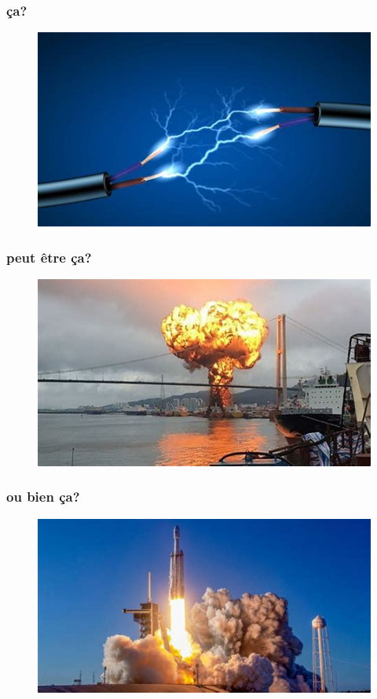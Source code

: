 \documentclass{beamer}
\begin{document}
    \begin{frame}
        \frametitle{ça?}
        
        \begin{figure}
            \includegraphics[width=0.8\linewidth]{electricite.jpg}
    \end{figure}
    \end{frame}

    \begin{frame}
        \frametitle{peut être ça?}
        
        \begin{figure}
            \includegraphics[width=0.8\linewidth]{explosion.jpg}
    \end{figure}
    \end{frame}

    \begin{frame}
        \frametitle{ou bien ça?}
        
        \begin{figure}
            \includegraphics[width=0.8\linewidth]{fusee.jpg}
    \end{figure}
    \end{frame}
\end{document}
